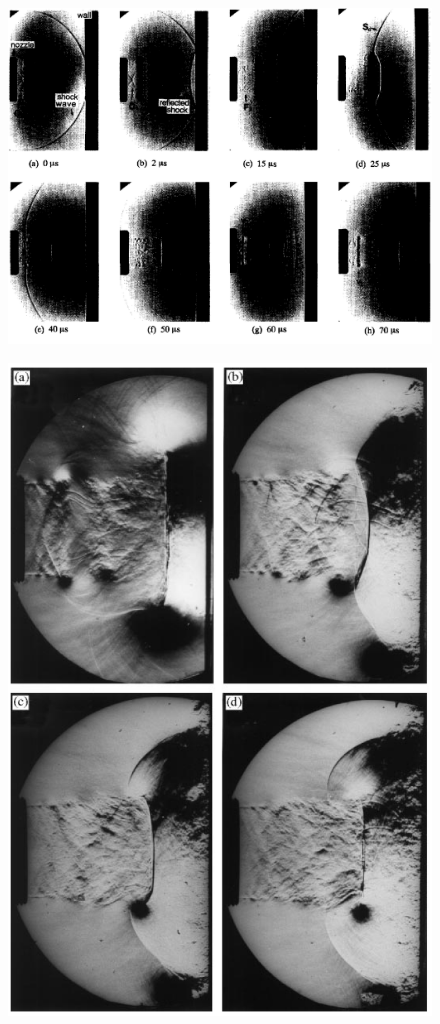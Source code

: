\begin{figure}[H] 
	\centering
	\includegraphics[scale=0.8]{minota.PNG} 
	\caption{\cite{minota1997}}
\end{figure}

\begin{figure}[H] 
	\centering
	\includegraphics[scale=0.8]{szumowski.PNG} 
	\caption{\cite{szumowski2000}}
\end{figure}

